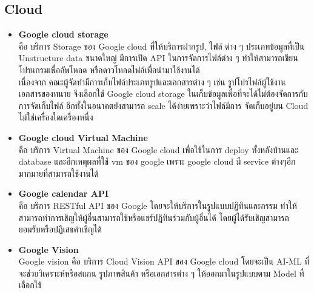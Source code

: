 \documentclass[12pt,oneside,openright,a4paper]{cpe-thai-project}
\begin{document}
\subsection{Cloud}
\begin{itemize}
\item \textbf{Google cloud storage} \\
\hspace*{1cm} คือ บริการ Storage ของ Google cloud ที่ให้บริการฝากรูป, ไฟล์ ต่าง ๆ ประเภทข้อมูลที่เป็น Unstructure data ขนาดใหญ่ มีการเปิด API ในการจัดการไฟล์ต่าง ๆ ทำให้สามารถเขียนโปรแกรมเพื่ออัพโหลด หรือดาวโหลดไฟล์เพื่อนำมาใช้งานได้ \\
\hspace*{1cm} เนื่องจาก คณะผู้จัดทำมีการเก็บไฟล์ประเภทรูปและเอกสารต่าง ๆ เช่น รูปโปรไฟล์ผู้ใช้งาน เอกสารของทนาย จึงเลือกใช้ Google cloud storage ในเก็บข้อมูลเพื่อที่จะได้ไม่ต้องจัดการกับการจัดเก็บไฟล์ อีกทั้งในอนาคตยังสามารถ scale ได้ง่ายเพราะว่าไฟล์มีการ จัดเก็บอยู่บน Cloud ไม่ใช่เครื่องใดเครื่องหนึ่ง \cite{WhatIsGoogleStorage}
\item \textbf{Google cloud Virtual Machine} \\
\hspace*{1cm} คือ บริการ Virtual Machine ของ Google cloud เพื่อใช้ในการ deploy ทั้งหลังบ้านและ database และอีกเหตุผลที่ใช้ vm ของ google เพราะ google cloud มี service ต่างๆอีกมากมายที่สามารถใช้งานได้ \cite{WhatIsVM,WhatIsGoogleCloudPlatform}
\item \textbf{Google calendar API} \\
\hspace*{1cm} คือ บริการ RESTful API ของ Google โดยจะให้บริการในรูปแบบปฏิทินและกรรม ทำให้สามารถทำการเชิญให้ผู้อื่นสามารถใช้หรือแชร์ปฏิทินร่วมกับผู้อื่นได้ โดยผู้ได้รับเชิญสามารถยอมรับหรือปฏิเสธคําเชิญได้ \cite{WhatIsGoogleCalendar}
\item \textbf{Google Vision} \\
\hspace*{1cm} Google vision  คือ บริการ Cloud Vision API ของ Google cloud โดยจะเป็น AI-ML ที่จะช่วยวิเคราะห์หรือสแกน รูปภาพสินค้า หรือเอกสารต่าง ๆ ให้ออกมาในรูปแบบตาม Model ที่เลือกใช้ \cite{WhatIsGoogleVision}
\end{itemize}
\end{document}
